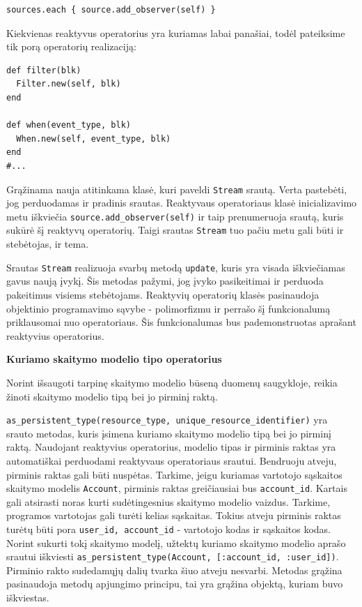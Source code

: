 \begin{lstlisting}
sources.each { source.add_observer(self) }
\end{lstlisting}

Kiekvienas reaktyvus operatorius yra kuriamas labai panašiai, todėl pateiksime tik porą operatorių realizaciją:

\begin{lstlisting}
def filter(blk)
  Filter.new(self, blk)
end

def when(event_type, blk)
  When.new(self, event_type, blk)
end
#...
\end{lstlisting}

Grąžinama nauja atitinkama klasė, kuri paveldi \lstinline|Stream| srautą. Verta pastebėti, jog perduodamas ir pradinis srautas. Reaktyvaus operatoriaus klasė inicializavimo metu iškviečia \lstinline|source.add_observer(self)| ir taip prenumeruoja srautą, kuris sukūrė šį reaktyvų operatorių. Taigi srautas \lstinline|Stream| tuo pačiu metu gali būti ir stebėtojas, ir tema.

Srautas \lstinline|Stream| realizuoja svarbų metodą \lstinline|update|, kuris yra visada iškviečiamas gavus naują įvykį. Šis metodas pažymi, jog įvyko pasikeitimai ir perduoda pakeitimus visiems stebėtojams. Reaktyvių operatorių klasės pasinaudoja objektinio programavimo sąvybe - polimorfizmu ir perrašo šį funkcionalumą priklausomai nuo operatoriaus. Šis funkcionalumas bus pademonstruotas aprašant reaktyvius operatorius.

\textbf{Kuriamo skaitymo modelio tipo operatorius}

Norint išsaugoti tarpinę skaitymo modelio būseną duomenų saugykloje, reikia žinoti skaitymo modelio tipą bei jo pirminį raktą.

\lstinline|as_persistent_type(resource_type, unique_resource_identifier)| yra srauto metodas, kuris įsimena kuriamo skaitymo modelio tipą bei jo pirminį raktą. Naudojant reaktyvius operatorius, modelio tipas ir pirminis raktas yra automatiškai perduodami reaktyvaus operatoriaus srautui. Bendruoju atveju, pirminis raktas gali būti nuspėtas. Tarkime, jeigu kuriamas vartotojo sąskaitos skaitymo modelis \lstinline|Account|, pirminis raktas greičiausiai bus \lstinline|account_id|. Kartais gali atsirasti noras kurti sudėtingesnius skaitymo modelio vaizdus. Tarkime, programos vartotojas gali turėti kelias sąskaitas. Tokius atveju pirminis raktas turėtų būti pora \lstinline|user_id, account_id| - vartotojo kodas ir sąskaitos kodas. Norint sukurti tokį skaitymo modelį, užtektų kuriamo skaitymo modelio aprašo srautui iškviesti \lstinline|as_persistent_type(Account, [:account_id, :user_id])|. Pirminio rakto sudedamųjų dalių tvarka šiuo atveju nesvarbi. Metodas grąžina pasinaudoja metodų apjungimo principu, tai yra grąžina objektą, kuriam buvo iškviestas.

